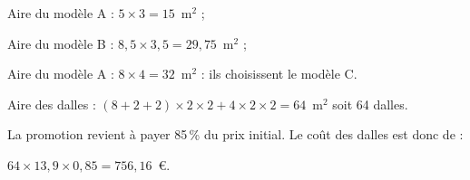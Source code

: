 Aire du modèle A : $5 \times 3 = 15$~m$^2$ ;

Aire du modèle B : $8,5 \times 3,5 = 29,75$~m$^2$ ;

Aire du modèle A : $8 \times 4 = 32$~m$^2$ : ils choisissent le modèle C.

Aire des dalles : $(8 + 2 + 2) \times 2 \times 2 + 4 \times 2 \times 2 = 64$~m$^2$ soit 64 dalles.

La promotion revient à payer 85\,\% du prix initial. Le coût des dalles est donc de :

$64 \times 13,9 \times 0,85 = 756,16$~\euro.
\vspace{0.25cm}

